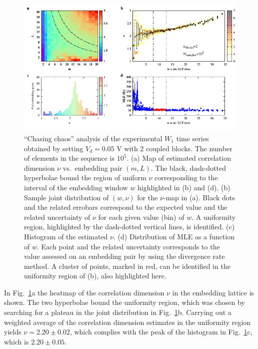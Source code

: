 \begin{figure}[!htbp]
    \centering
    \includegraphics[width=\linewidth]{../blocks/2_blocks/1e5_points/plots/chaos.pdf}
    \caption{``Chasing chaos'' analysis of the experimental $W_1$ time series
    obtained by setting $V_d=0.05$ V with 2 coupled blocks.
    The number of elements in the sequence is $10^5$.
    (a) Map of estimated correlation dimension $\nu$ vs.\ embedding pair $(m, L)$.
    The black, dash-dotted hyperbolae bound the region of uniform $\nu$ corresponding to the interval of the
    embedding window $w$ highlighted in (b) and (d).
    (b) Sample joint distribution of $(w,\nu)$ for the $\nu$-map in (a).
    Black dots and the related errobars correspond to the expected value and the related uncertainty of $\nu$
    for each given value (bin) of $w$. A uniformity region, highlighted by the dash-dotted vertical lines,
    is identified. (c) Histogram of the estimated $\nu$. (d) Distribution of MLE as a function of $w$. Each point and the related
    uncertainty corresponds to the value assessed on an embedding pair by using the divergence rate method.
    A cluster of points, marked in red, can be identified in the uniformity region of (b), also highlighted here.
    }\label{fig:2 blocks chaos}
\end{figure}

In Fig.~\ref{fig:2 blocks chaos}a the heatmap of the correlation dimension $\nu$ in the embedding
lattice is shown. The two hyperbolae bound the uniformity region, which was chosen by searching for
a plateau in the joint distribution in Fig.~\ref{fig:2 blocks chaos}b.
Carrying out a weighted average of the correlation dimension estimates in the uniformity region yields
$\nu=2.20\pm0.02$, which complies with the peak of the histogram in Fig.~\ref{fig:2 blocks chaos}c,
which is $2.20\pm0.05$.

